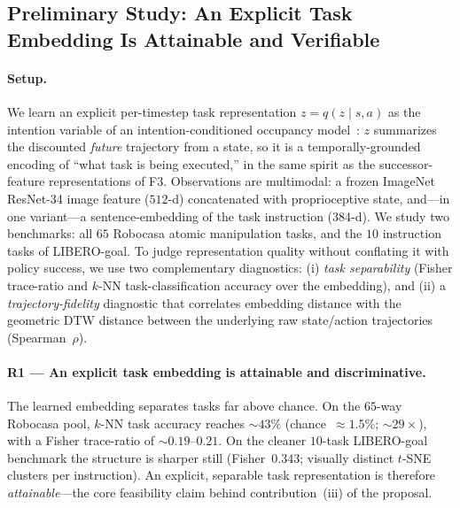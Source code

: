 \subsection{Preliminary Study: An Explicit Task Embedding Is Attainable and Verifiable}
\label{sec:findings:study}

\paragraph{Setup.} We learn an explicit per-timestep task representation
$z = q(z \mid s, a)$ as the intention variable of an intention-conditioned
occupancy model~\cite{infom}: $z$ summarizes the discounted \emph{future}
trajectory from a state, so it is a temporally-grounded encoding of ``what task
is being executed,'' in the same spirit as the successor-feature representations
of F3. Observations are multimodal: a frozen ImageNet ResNet-34 image feature
($512$-d) concatenated with proprioceptive state, and---in one variant---a
sentence-embedding of the task instruction ($384$-d). We study two benchmarks:
all $65$ Robocasa atomic manipulation tasks, and the $10$ instruction tasks of
LIBERO-goal. To judge representation quality without conflating it with policy
success, we use two complementary diagnostics: (i) \emph{task separability}
(Fisher trace-ratio and $k$-NN task-classification accuracy over the embedding),
and (ii) a \emph{trajectory-fidelity} diagnostic that correlates embedding
distance with the geometric DTW distance between the underlying raw
state/action trajectories (Spearman~$\rho$).

\paragraph{R1 --- An explicit task embedding is attainable and discriminative.}
The learned embedding separates tasks far above chance. On the $65$-way Robocasa
pool, $k$-NN task accuracy reaches $\sim\!43\%$ (chance~$\approx\!1.5\%$;
$\sim\!29\times$), with a Fisher trace-ratio of $\sim\!0.19$--$0.21$. On the
cleaner $10$-task LIBERO-goal benchmark the structure is sharper still
(Fisher~$0.343$; visually distinct $t$-SNE clusters per instruction). An
explicit, separable task representation is therefore \emph{attainable}---the
core feasibility claim behind contribution~(iii) of the proposal.

